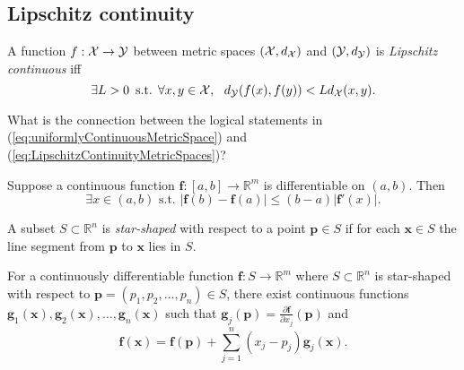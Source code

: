 \subsection{Lipschitz continuity}
\label{sec:lipschitz-continuity}

\begin{defn}
  \label{def:LipschitzContinuityMetricSpaces}
  A function $f: {\cal X} \rightarrow {\cal Y}$ between
  metric spaces $({\cal X},d_{\cal X})$ and $({\cal Y}, d_{\cal Y})$ 
  is \emph{Lipschitz continuous} iff
  \begin{equation}
    \label{eq:LipschitzContinuityMetricSpaces}
    \exists L>0\, \text{ s.t. }
     \forall x,y \in {\cal X}, \ \ 
    d_{\cal Y}(f(x),f(y)) < L d_{\cal X}(x,y). 
  \end{equation}
\end{defn}

\begin{exc}
  What is the connection between the logical statements
  in (\ref{eq:uniformlyContinuousMetricSpace})
  and (\ref{eq:LipschitzContinuityMetricSpaces})? 
\end{exc}

\begin{thm}
  \label{thm:vectorMeanValue}
  Suppose a continuous function $\mathbf{f}: [a,b]\rightarrow \mathbb{R}^m$
  is differentiable on $(a,b)$. Then 
  \begin{equation}
    \label{eq:vectorMeanValue}
    \exists x\in(a,b) \text{ s.t. }
    |\mathbf{f}(b)-\mathbf{f}(a)|\le (b-a)|\mathbf{f}'(x)|.
  \end{equation}
\end{thm}

\begin{defn}
  \label{def:starShapedSet}
  A subset $S\subset \mathbb{R}^n$ is \emph{star-shaped} with
  respect to a point $\mathbf{p}\in S$ if for each $\mathbf{x}\in S$
  the line segment from $\mathbf{p}$ to $\mathbf{x}$ lies in $S$.
\end{defn}

\begin{thm}
  \label{thm:meanValueVectorSimilar}
  For a continuously differentiable function
  $\mathbf{f}: S\rightarrow \mathbb{R}^m$
  where $S\subset \mathbb{R}^n$
  is star-shaped with respect to $\mathbf{p}=(p_1,p_2,\ldots,p_n)\in S$, 
  there exist continuous functions
  $\mathbf{g}_1(\mathbf{x}),
  \mathbf{g}_2(\mathbf{x}), \ldots, \mathbf{g}_n(\mathbf{x})$
  such that
  $\mathbf{g}_j(\mathbf{p}) = \frac{\partial \mathbf{f}}{\partial x_j}(\mathbf{p})$
  and 
  \begin{equation}
    \label{eq:meanValueVectorSimilar}
    \mathbf{f}(\mathbf{x}) = \mathbf{f}(\mathbf{p})
    + \sum_{j=1}^n(x_j-p_j) \mathbf{g}_j(\mathbf{x}). 
  \end{equation}
\end{thm}

